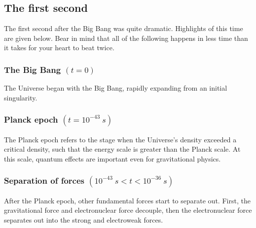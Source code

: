 \documentclass[]{book}
\begin{document}
\hypertarget{sec:first_second}{%
\subsection{The first second}\label{sec:first_second}}

The first second after the Big Bang was quite dramatic. Highlights of
this time are given below. Bear in mind that all of the following
happens in less time than it takes for your heart to beat twice.

\hypertarget{the-big-bang-t-0}{%
\subsubsection*{\texorpdfstring{The Big Bang \((t = 0)\)}{The Big Bang (t = 0)}}\label{the-big-bang-t-0}}

The Universe began with the Big Bang, rapidly expanding from an initial
singularity.

\hypertarget{planck-epoch-t-10-43s}{%
\subsubsection*{\texorpdfstring{Planck epoch \((t = 10^{-43}~s)\)}{Planck epoch (t = 10\^{}\{-43\}\textasciitilde{}s)}}\label{planck-epoch-t-10-43s}}

The Planck epoch refers to the stage when the Universe's density
exceeded a critical density, such that the energy scale is greater than
the Planck scale. At this scale, quantum effects are important even for
gravitational physics.

\hypertarget{separation-of-forces-10-43s-t-10-36s}{%
\subsubsection*{\texorpdfstring{Separation of forces \((10^{-43}~s < t < 10^{-36}~s)\)}{Separation of forces (10\^{}\{-43\}\textasciitilde{}s \textless{} t \textless{} 10\^{}\{-36\}\textasciitilde{}s)}}\label{separation-of-forces-10-43s-t-10-36s}}

After the Planck epoch, other fundamental forces start to separate out.
First, the gravitational force and electronuclear force decouple, then
the electronuclear force separates out into the strong and electroweak
forces.
\end{document}
